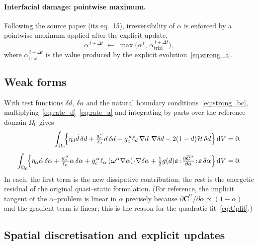 \documentclass[12pt,a4paper]{article}
\newcommand{\beps}{\boldsymbol{\varepsilon}}
\newcommand{\bomega}{\boldsymbol{\omega}}
\newcommand{\Ca}{\overline{\mathbf{C}}^{\alpha}}     %
\newcommand{\dd}{\,\mathrm{d}}
\newcommand{\Dt}{\Delta t}
\begin{document}
	\paragraph{Interfacial damage: pointwise maximum.}
	Following the source paper (its eq.~15), irreversibility of $\alpha$ is enforced
	by a pointwise maximum applied after the explicit update,
	\begin{equation}\label{eq:airrev}
		\alpha^{\,t+\Dt} \;\leftarrow\; \max\bigl(\alpha^{\,t},\,\alpha^{\,t+\Dt}_{\mathrm{trial}}\bigr),
	\end{equation}
	where $\alpha^{\,t+\Dt}_{\mathrm{trial}}$ is the value produced by the explicit
	evolution~\eqref{eq:strong_a}.

	\subsection{Weak forms}

	With test functions $\delta d$, $\delta\alpha$ and the natural boundary
	conditions~\eqref{eq:strong_bc}, multiplying~\eqref{eq:rate_d}--\eqref{eq:rate_a}
	and integrating by parts over the reference domain $\Omega_0$ gives
	\begin{align}
		\int_{\Omega_0}\!\Bigl\{\eta_d\dot d\,\delta d
		+ \tfrac{g_c^{\,d}}{\ell_d}d\,\delta d
		+ g_c^{\,d}\ell_d\,\nabla d\!\cdot\!\nabla\delta d
		- 2(1-d)\mathcal{H}\,\delta d\Bigr\}\dd V &= 0, \label{eq:weak_d}\\[4pt]
		\int_{\Omega_0}\!\Bigl\{\eta_\alpha\dot\alpha\,\delta\alpha
		+ \tfrac{g_c^{\,\alpha}}{\ell_\alpha}\alpha\,\delta\alpha
		+ g_c^{\,\alpha}\ell_\alpha\,(\bomega^{\alpha}\nabla\alpha)\!\cdot\!\nabla\delta\alpha
		+ \tfrac12 g(d)\beps\!:\!\tfrac{\partial\Ca}{\partial\alpha}\!:\!\beps\,\delta\alpha\Bigr\}\dd V &= 0. \label{eq:weak_a}
	\end{align}
	In each, the first term is the new dissipative contribution; the rest is the
	energetic residual of the original quasi--static formulation. (For reference, the
	implicit tangent of the $\alpha$--problem is linear in $\alpha$ precisely because
	$\partial\Ca/\partial\alpha\propto(1-\alpha)$ and the gradient term is linear;
	this is the reason for the quadratic fit~\eqref{eq:Cpfit}.)

	\subsection{Spatial discretisation and explicit updates}
\end{document}
